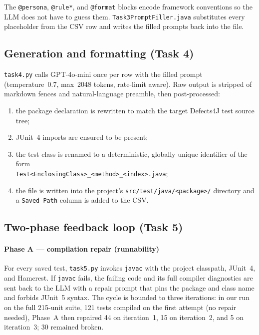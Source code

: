 \documentclass[conference]{IEEEtran}
\begin{document}
The \texttt{@persona}, \texttt{@rule*}, and \texttt{@format} blocks
encode framework conventions so the LLM does not have to guess them.
\texttt{Task3PromptFiller.java} substitutes every placeholder from the
CSV row and writes the filled prompts back into the file.

\subsection{Generation and formatting (Task 4)}
\texttt{task4.py} calls GPT-4o-mini once per row with the filled prompt
(temperature~0.7, max~2048 tokens, rate-limit aware). Raw output is
stripped of markdown fences and natural-language preamble, then
post-processed:
\begin{enumerate}
  \item the package declaration is rewritten to match the target
        Defects4J test source tree;
  \item JUnit~4 imports are ensured to be present;
  \item the test class is renamed to a deterministic, globally unique
        identifier of the form\\
        \texttt{Test<EnclosingClass>\_\linebreak <method>\_<index>.java};
  \item the file is written into the project's
        \texttt{src/test/java/<package>/} directory and a
        \texttt{Saved~Path} column is added to the CSV.
\end{enumerate}

\subsection{Two-phase feedback loop (Task 5)}

\paragraph{Phase A — compilation repair (runnability)}
For every saved test, \texttt{task5.py} invokes \texttt{javac} with the
project classpath, JUnit~4, and Hamcrest. If \texttt{javac} fails, the
failing code and its full compiler diagnostics are sent back to the LLM
with a repair prompt that pins the package and class name and forbids
JUnit~5 syntax. The cycle is bounded to three iterations: in our run
on the full 215-unit suite, 121 tests compiled on the first attempt
(no repair needed), Phase~A then repaired 44 on iteration~1, 15 on
iteration~2, and 5 on iteration~3; 30 remained broken.
\end{document}
